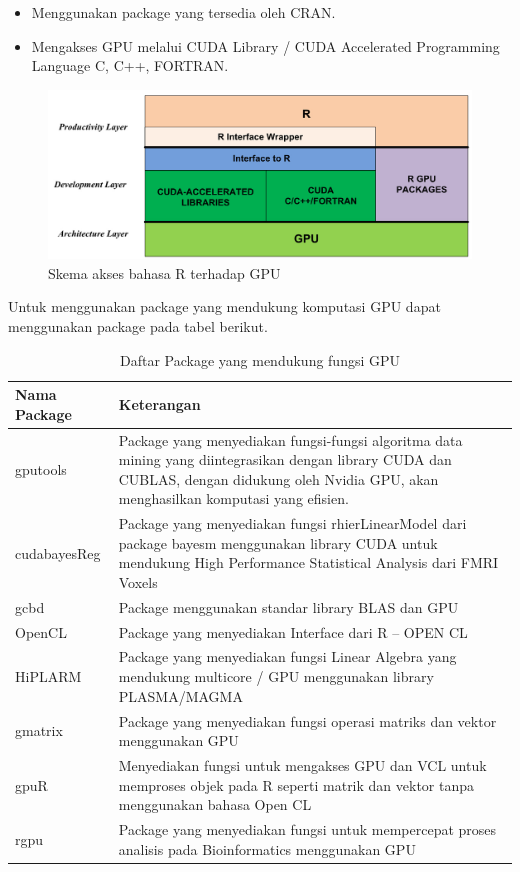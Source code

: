 \begin{itemize}
\item Menggunakan package yang tersedia oleh CRAN.
\item Mengakses GPU melalui CUDA Library / CUDA Accelerated Programming Language C, C++, FORTRAN.
\end{itemize}

\begin{figure}
\centering
\includegraphics[width=0.7\linewidth]{./pics/skemaaksesgpu}
\caption{Skema akses bahasa R terhadap GPU}
\label{fig:skemaaksesgpu}
\end{figure}

Untuk menggunakan package yang mendukung komputasi GPU dapat menggunakan package pada tabel berikut.

\begin{table}
\caption{Daftar Package yang mendukung fungsi GPU}
\label{tab:contoh_gpu}
\begin{tabular}{|L{5cm}|L{9cm}|}
 \hline Nama Package
 & Keterangan \\ 
\hline gputools & Package yang menyediakan fungsi-fungsi algoritma data mining yang diintegrasikan dengan library CUDA dan CUBLAS, dengan didukung oleh Nvidia GPU, akan menghasilkan komputasi yang efisien.
 \\ 
\hline cudabayesReg & Package yang menyediakan fungsi rhierLinearModel dari package bayesm menggunakan library CUDA untuk mendukung High Performance Statistical Analysis dari FMRI Voxels \\ 
\hline gcbd & Package menggunakan standar library  BLAS dan GPU
 \\ 
\hline OpenCL
 & Package yang menyediakan Interface dari R – OPEN CL \\ 
\hline HiPLARM & Package yang menyediakan fungsi Linear Algebra yang mendukung multicore / GPU menggunakan library PLASMA/MAGMA  \\ 
\hline gmatrix & Package yang menyediakan fungsi operasi matriks dan vektor menggunakan GPU \\ 
\hline gpuR & Menyediakan fungsi untuk mengakses GPU dan VCL untuk memproses objek pada R seperti matrik dan vektor tanpa menggunakan bahasa Open CL  \\ 
\hline rgpu & Package yang menyediakan fungsi untuk mempercepat proses analisis pada Bioinformatics menggunakan GPU \\ 
\hline 
\end{tabular} 
\end{table}

